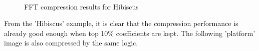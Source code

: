 \documentclass[12pt]{article}
\begin{document}
\begin{figure}[H]
    \centering
    \\
    \caption{FFT compression results for Hibiscus}
    \label{ref_label_overall}
\end{figure}
\begin{flushleft}
From the 'Hibiscus' example, it is clear that the compression performance is already good enough when top 10\% coefficients are kept.
The following 'platform' image is also compressed by the same logic.
\end{flushleft}
\end{document}
